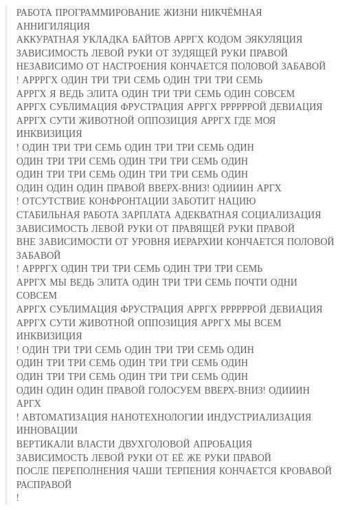 \poemtitle{***}
\begin{verse}
РАБОТА ПРОГРАММИРОВАНИЕ ЖИЗНИ НИКЧЁМНАЯ АННИГИЛЯЦИЯ\\
АККУРАТНАЯ УКЛАДКА БАЙТОВ АРРГХ КОДОМ ЭЯКУЛЯЦИЯ\\
ЗАВИСИМОСТЬ ЛЕВОЙ РУКИ ОТ ЗУДЯЩЕЙ РУКИ ПРАВОЙ \\
НЕЗАВИСИМО ОТ НАСТРОЕНИЯ КОНЧАЕТСЯ ПОЛОВОЙ ЗАБАВОЙ\\!
АРРРГХ ОДИН ТРИ ТРИ СЕМЬ ОДИН ТРИ ТРИ СЕМЬ\\
АРРГХ Я ВЕДЬ ЭЛИТА ОДИН ТРИ ТРИ СЕМЬ ОДИН СОВСЕМ\\
АРРГХ СУБЛИМАЦИЯ ФРУСТРАЦИЯ АРРГХ РРРРРРОЙ ДЕВИАЦИЯ\\
АРРГХ СУТИ ЖИВОТНОЙ ОППОЗИЦИЯ АРРГХ ГДЕ МОЯ ИНКВИЗИЦИЯ\\!
ОДИН ТРИ ТРИ СЕМЬ ОДИН ТРИ ТРИ СЕМЬ ОДИН\\
ОДИН ТРИ ТРИ СЕМЬ ОДИН ТРИ ТРИ СЕМЬ ОДИН\\
ОДИН ТРИ ТРИ СЕМЬ ОДИН ТРИ ТРИ СЕМЬ ОДИН\\
ОДИН ОДИН ОДИН ПРАВОЙ ВВЕРХ-ВНИЗ! ОДИИИН АРГХ\\!
ОТСУТСТВИЕ КОНФРОНТАЦИИ ЗАБОТИТ НАЦИЮ\\
СТАБИЛЬНАЯ РАБОТА ЗАРПЛАТА АДЕКВАТНАЯ СОЦИАЛИЗАЦИЯ\\
ЗАВИСИМОСТЬ ЛЕВОЙ РУКИ ОТ ПРАВЯЩЕЙ РУКИ ПРАВОЙ\\
ВНЕ ЗАВИСИМОСТИ ОТ УРОВНЯ ИЕРАРХИИ КОНЧАЕТСЯ ПОЛОВОЙ ЗАБАВОЙ\\!
АРРРГХ ОДИН ТРИ ТРИ СЕМЬ ОДИН ТРИ ТРИ СЕМЬ\\
АРРГХ МЫ ВЕДЬ ЭЛИТА ОДИН ТРИ ТРИ СЕМЬ ПОЧТИ ОДНИ СОВСЕМ\\
АРРГХ СУБЛИМАЦИЯ ФРУСТРАЦИЯ АРРГХ РРРРРРОЙ ДЕВИАЦИЯ\\
АРРГХ СУТИ ЖИВОТНОЙ ОППОЗИЦИЯ АРРГХ МЫ ВСЕМ ИНКВИЗИЦИЯ\\!
ОДИН ТРИ ТРИ СЕМЬ ОДИН ТРИ ТРИ СЕМЬ ОДИН\\
ОДИН ТРИ ТРИ СЕМЬ ОДИН ТРИ ТРИ СЕМЬ ОДИН\\
ОДИН ТРИ ТРИ СЕМЬ ОДИН ТРИ ТРИ СЕМЬ ОДИН\\
ОДИН ОДИН ОДИН ПРАВОЙ ГОЛОСУЕМ ВВЕРХ-ВНИЗ! ОДИИИН АРГХ\\!
АВТОМАТИЗАЦИЯ НАНОТЕХНОЛОГИИ ИНДУСТРИАЛИЗАЦИЯ ИННОВАЦИИ\\
ВЕРТИКАЛИ ВЛАСТИ ДВУХГОЛОВОЙ АПРОБАЦИЯ\\
ЗАВИСИМОСТЬ ЛЕВОЙ РУКИ ОТ ЕЁ ЖЕ РУКИ ПРАВОЙ\\
ПОСЛЕ ПЕРЕПОЛНЕНИЯ ЧАШИ ТЕРПЕНИЯ КОНЧАЕТСЯ КРОВАВОЙ РАСПРАВОЙ\\!

\end{verse}
